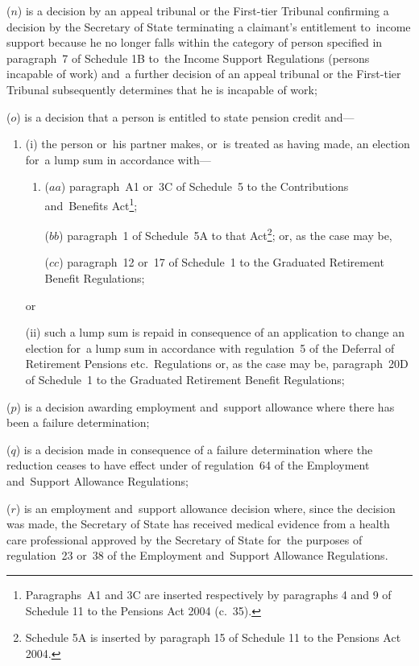 \documentclass[12pt,a4paper]{article}
\begin{document}
\begin{enumerate}
($n$) is a decision by 
an appeal tribunal or  %
the First-tier Tribunal  %
confirming a decision by the Secretary of State terminating a claimant’s entitlement to~income support because he no longer falls within the category of person specified in paragraph~7 of Schedule 1B to~the Income Support Regulations (persons incapable of work) and~a further 
decision of an appeal tribunal or the First-tier Tribunal  %
subsequently determines that he is incapable of work;

($o$) is a decision that a person is entitled to state pension credit and—
\begin{enumerate}\item[]
(i) the person or~his partner makes, or~is treated as having made, an election for~a lump sum in accordance with—
\begin{enumerate}\item[]
($aa$) paragraph~A1 or~3C of Schedule~5 to the Contributions and~Benefits Act\footnote{Paragraphs~A1 and 3C are inserted respectively by paragraphs 4 and 9 of Schedule 11 to the Pensions Act 2004 (c.~35).};

($bb$) paragraph~1 of Schedule~5A to that Act\footnote{Schedule 5A is inserted by paragraph 15 of Schedule 11 to the Pensions Act 2004.}; or, as the case may be,

($cc$) paragraph~12 or~17 of Schedule~1 to the Graduated Retirement Benefit Regulations;
\end{enumerate}
or

(ii) such a lump sum is repaid in consequence of an application to change an election for~a lump sum in accordance with regulation~5 of the Deferral of Retirement Pensions etc.\ Regulations or, as the case may be, paragraph~20D of Schedule~1 to the Graduated Retirement Benefit Regulations;
\end{enumerate}

($p$) is a decision awarding employment and~support allowance where there has been a failure determination;

($q$) is a decision made in consequence of a failure determination where the reduction ceases to have effect under of regulation~64 of the Employment and~Support Allowance Regulations;

($r$) is an employment and~support allowance decision where, since the decision was made, the Secretary of State has received medical evidence from a health care professional approved by the Secretary of State for~the purposes of regulation~23 or~38 of the Employment and~Support Allowance Regulations.
\end{enumerate}
\end{document}
